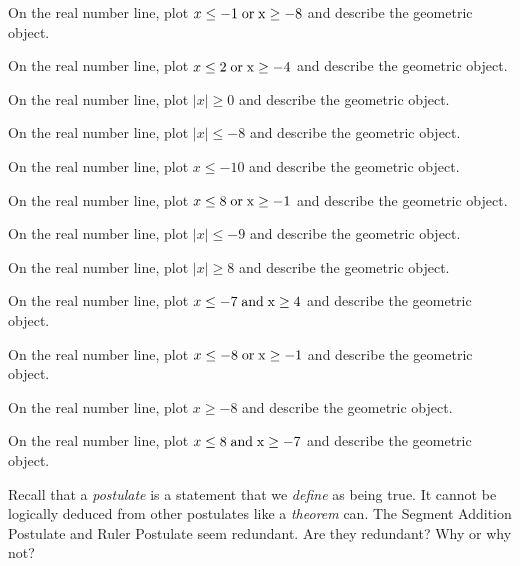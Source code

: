 \documentclass[12pt]{article}
\newenvironment{problem}[2][Problem]{\begin{trivlist}
			\item[\hskip \labelsep {\bfseries #1}\hskip \labelsep {\bfseries #2.}]}{\end{trivlist}}
\begin{document}
			\begin{problem}{0} 
On the real number line, plot $ x \leq -1 \;\rm{ or }\; x \geq -8$ and describe the geometric object.
 \end{problem}\begin{problem}{1} 
On the real number line, plot $ x \leq 2 \;\rm{ or }\; x \geq -4$ and describe the geometric object.
 \end{problem}\begin{problem}{2} 
On the real number line, plot $\mid x\mid \geq 0$ and describe the geometric object.
 \end{problem}\begin{problem}{3} 
On the real number line, plot $\mid x\mid \leq -8$ and describe the geometric object.
 \end{problem}\begin{problem}{4} 
On the real number line, plot $x \leq -10$ and describe the geometric object.
 \end{problem}\begin{problem}{5} 
On the real number line, plot $ x \leq 8 \;\rm{ or }\; x \geq -1$ and describe the geometric object.
 \end{problem}\begin{problem}{6} 
On the real number line, plot $\mid x\mid \leq -9$ and describe the geometric object.
 \end{problem}\begin{problem}{7} 
On the real number line, plot $\mid x\mid \geq 8$ and describe the geometric object.
 \end{problem}\begin{problem}{8} 
On the real number line, plot $ x \leq -7 \;\rm{ and }\; x \geq 4$ and describe the geometric object.
 \end{problem}\begin{problem}{9} 
On the real number line, plot $ x \leq -8 \;\rm{ or }\; x \geq -1$ and describe the geometric object.
 \end{problem}\begin{problem}{10} 
On the real number line, plot $x \geq -8$ and describe the geometric object.
 \end{problem}\begin{problem}{11} 
On the real number line, plot $ x \leq 8 \;\rm{ and }\; x \geq -7$ and describe the geometric object.
 \end{problem}\begin{problem}{Challenge} 

	Recall that a \textit{postulate} is a statement that we \textit{define} as being true. It cannot
	be logically deduced from other postulates like a \textit{theorem} can.
	The Segment Addition Postulate and Ruler Postulate seem redundant. Are they redundant? Why or why not?
	
 \end{problem}
\end{document}
